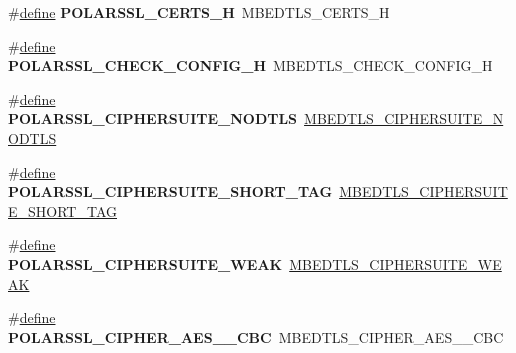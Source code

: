 \begin{DoxyCompactItemize}
\item 
\mbox{\label{compat-1_83_8h_a3bbc165b85d9cea741d09150e418973d}} 
\#\hyperlink{structdefine}{define} {\bfseries P\+O\+L\+A\+R\+S\+S\+L\+\_\+\+C\+E\+R\+T\+S\+\_\+H}~M\+B\+E\+D\+T\+L\+S\+\_\+\+C\+E\+R\+T\+S\+\_\+H
\item 
\mbox{\label{compat-1_83_8h_a35f628e4b8869450e4a8816dced3785f}} 
\#\hyperlink{structdefine}{define} {\bfseries P\+O\+L\+A\+R\+S\+S\+L\+\_\+\+C\+H\+E\+C\+K\+\_\+\+C\+O\+N\+F\+I\+G\+\_\+H}~M\+B\+E\+D\+T\+L\+S\+\_\+\+C\+H\+E\+C\+K\+\_\+\+C\+O\+N\+F\+I\+G\+\_\+H
\item 
\mbox{\label{compat-1_83_8h_a0fef789a1c5fb544a4d5b3b5eb521beb}} 
\#\hyperlink{structdefine}{define} {\bfseries P\+O\+L\+A\+R\+S\+S\+L\+\_\+\+C\+I\+P\+H\+E\+R\+S\+U\+I\+T\+E\+\_\+\+N\+O\+D\+T\+LS}~\hyperlink{ssl__ciphersuites_8h_a9b28a41a6dc8566ed93e1d534572785f}{M\+B\+E\+D\+T\+L\+S\+\_\+\+C\+I\+P\+H\+E\+R\+S\+U\+I\+T\+E\+\_\+\+N\+O\+D\+T\+LS}
\item 
\mbox{\label{compat-1_83_8h_ad6a95e1669ec593781489189077ff727}} 
\#\hyperlink{structdefine}{define} {\bfseries P\+O\+L\+A\+R\+S\+S\+L\+\_\+\+C\+I\+P\+H\+E\+R\+S\+U\+I\+T\+E\+\_\+\+S\+H\+O\+R\+T\+\_\+\+T\+AG}~\hyperlink{ssl__ciphersuites_8h_aa4802f19cdfd24bb9cdbf643460b0355}{M\+B\+E\+D\+T\+L\+S\+\_\+\+C\+I\+P\+H\+E\+R\+S\+U\+I\+T\+E\+\_\+\+S\+H\+O\+R\+T\+\_\+\+T\+AG}
\item 
\mbox{\label{compat-1_83_8h_a0cfe408058ec3f630c6b8b16c14d14db}} 
\#\hyperlink{structdefine}{define} {\bfseries P\+O\+L\+A\+R\+S\+S\+L\+\_\+\+C\+I\+P\+H\+E\+R\+S\+U\+I\+T\+E\+\_\+\+W\+E\+AK}~\hyperlink{ssl__ciphersuites_8h_a16358b8eb0384954a6932a13fbebb13e}{M\+B\+E\+D\+T\+L\+S\+\_\+\+C\+I\+P\+H\+E\+R\+S\+U\+I\+T\+E\+\_\+\+W\+E\+AK}
\item 
\mbox{\label{compat-1_83_8h_a5eca891b6c2e88f19ae6e4f674c34039}} 
\#\hyperlink{structdefine}{define} {\bfseries P\+O\+L\+A\+R\+S\+S\+L\+\_\+\+C\+I\+P\+H\+E\+R\+\_\+\+A\+E\+S\+\_\+\_\+\+C\+BC}~M\+B\+E\+D\+T\+L\+S\+\_\+\+C\+I\+P\+H\+E\+R\+\_\+\+A\+E\+S\+\_\+\_\+\+C\+BC
\item 
\mbox{\label{compat-1_83_8h_aec158b4d302d0542676406ee671c9476}} 

\end{DoxyCompactItemize}
